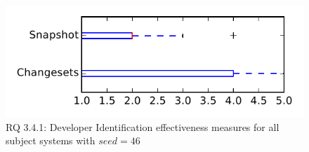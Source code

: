 
\begin{figure}
\centering
\includegraphics[height=0.4\textheight]{figures/dit_seed/rq1_tiny_46}
\caption{RQ 3.4.1: Developer Identification effectiveness measures for all subject systems with $seed=46$}
\label{fig:dit_seed:rq1:tiny}
\end{figure}

